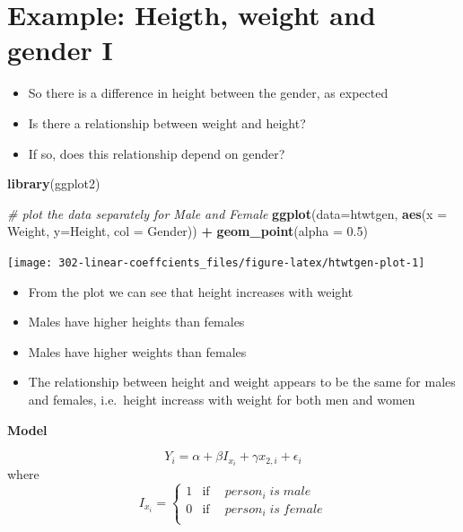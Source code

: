 \documentclass[
]{book}
\newenvironment{Shaded}{\begin{snugshade}}{\end{snugshade}}
\newcommand{\CommentTok}[1]{\textcolor[rgb]{0.56,0.35,0.01}{\textit{#1}}}
\newcommand{\DataTypeTok}[1]{\textcolor[rgb]{0.13,0.29,0.53}{#1}}
\newcommand{\FloatTok}[1]{\textcolor[rgb]{0.00,0.00,0.81}{#1}}
\newcommand{\KeywordTok}[1]{\textcolor[rgb]{0.13,0.29,0.53}{\textbf{#1}}}
\newcommand{\NormalTok}[1]{#1}
\newcommand{\OperatorTok}[1]{\textcolor[rgb]{0.81,0.36,0.00}{\textbf{#1}}}
\newcommand{\StringTok}[1]{\textcolor[rgb]{0.31,0.60,0.02}{#1}}
\providecommand{\tightlist}{%
  \setlength{\itemsep}{0pt}\setlength{\parskip}{0pt}}
\theoremstyle{definition}
\theoremstyle{definition}
\theoremstyle{definition}
\theoremstyle{remark}
\begin{document}
\hypertarget{example-heigth-weight-and-gender-i}{%
\section{Example: Heigth, weight and gender I}\label{example-heigth-weight-and-gender-i}}

\begin{itemize}
\tightlist
\item
  So there is a difference in height between the gender, as expected
\item
  Is there a relationship between weight and height?
\item
  If so, does this relationship depend on gender?
\end{itemize}

\begin{Shaded}
\begin{Highlighting}[]
\KeywordTok{library}\NormalTok{(ggplot2)}

\CommentTok{\# plot the data separately for Male and Female}
\KeywordTok{ggplot}\NormalTok{(}\DataTypeTok{data=}\NormalTok{htwtgen, }\KeywordTok{aes}\NormalTok{(}\DataTypeTok{x =}\NormalTok{ Weight, }\DataTypeTok{y=}\NormalTok{Height, }\DataTypeTok{col =}\NormalTok{ Gender)) }\OperatorTok{+}\StringTok{ }
\StringTok{  }\KeywordTok{geom\_point}\NormalTok{(}\DataTypeTok{alpha =} \FloatTok{0.5}\NormalTok{)}
\end{Highlighting}
\end{Shaded}

\begin{center}\texttt{[image: 302-linear-coeffcients\_files/figure-latex/htwtgen-plot-1]} \end{center}

\begin{itemize}
\tightlist
\item
  From the plot we can see that height increases with weight
\item
  Males have higher heights than females
\item
  Males have higher weights than females
\item
  The relationship between height and weight appears to be the same for males and females, i.e.~height increass with weight for both men and women
\end{itemize}

\textbf{Model}

\[Y_i = \alpha + \beta I_{x_i} + \gamma x_{2,i} + \epsilon_i\]
where
\begin{equation}
    I_{x_i} =
    \left\{
        \begin{array}{cc}
                1 & \mathrm{if\ } \quad person_i\;is\;male \\
                0 & \mathrm{if\ } \quad person_i\;is\;female \\
        \end{array}
    \right.
\end{equation}
\end{document}
